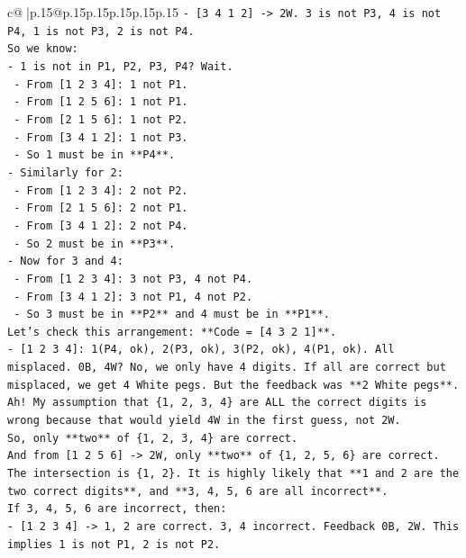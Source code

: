 \documentclass{article}
\begin{document}
{\begin{supertabular}{c@{$\;$}|p{.15\linewidth}@{}p{.15\linewidth}p{.15\linewidth}p{.15\linewidth}p{.15\linewidth}p{.15\linewidth}}
{{{\texttt{{-} {[}3 4 1 2{]} {-}> 2W. 3 is not P3, 4 is not P4, 1 is not P3, 2 is not P4.} \\
\texttt{So we know:} \\
\texttt{{-} 1 is not in P1, P2, P3, P4? Wait.} \\
\texttt{  {-} From {[}1 2 3 4{]}: 1 not P1.} \\
\texttt{  {-} From {[}1 2 5 6{]}: 1 not P1.} \\
\texttt{  {-} From {[}2 1 5 6{]}: 1 not P2.} \\
\texttt{  {-} From {[}3 4 1 2{]}: 1 not P3.} \\
\texttt{  {-} So 1 must be in **P4**.} \\
\texttt{{-} Similarly for 2:} \\
\texttt{  {-} From {[}1 2 3 4{]}: 2 not P2.} \\
\texttt{  {-} From {[}2 1 5 6{]}: 2 not P1.} \\
\texttt{  {-} From {[}3 4 1 2{]}: 2 not P4.} \\
\texttt{  {-} So 2 must be in **P3**.} \\
\texttt{{-} Now for 3 and 4:} \\
\texttt{  {-} From {[}1 2 3 4{]}: 3 not P3, 4 not P4.} \\
\texttt{  {-} From {[}3 4 1 2{]}: 3 not P1, 4 not P2.} \\
\texttt{  {-} So 3 must be in **P2** and 4 must be in **P1**.} \\
\texttt{Let's check this arrangement: **Code = {[}4 3 2 1{]}**.} \\
\texttt{{-} {[}1 2 3 4{]}: 1(P4, ok), 2(P3, ok), 3(P2, ok), 4(P1, ok). All misplaced. 0B, 4W? No, we only have 4 digits. If all are correct but misplaced, we get 4 White pegs. But the feedback was **2 White pegs**.} \\
\texttt{Ah! My assumption that \{1, 2, 3, 4\} are ALL the correct digits is wrong because that would yield 4W in the first guess, not 2W.} \\
\texttt{So, only **two** of \{1, 2, 3, 4\} are correct.} \\
\texttt{And from {[}1 2 5 6{]} {-}> 2W, only **two** of \{1, 2, 5, 6\} are correct.} \\
\texttt{The intersection is \{1, 2\}. It is highly likely that **1 and 2 are the two correct digits**, and **3, 4, 5, 6 are all incorrect**.} \\
\texttt{If 3, 4, 5, 6 are incorrect, then:} \\
\texttt{{-} {[}1 2 3 4{]} {-}> 1, 2 are correct. 3, 4 incorrect. Feedback 0B, 2W. This implies 1 is not P1, 2 is not P2.} \\
}}}
\end{supertabular}}
\end{document}
